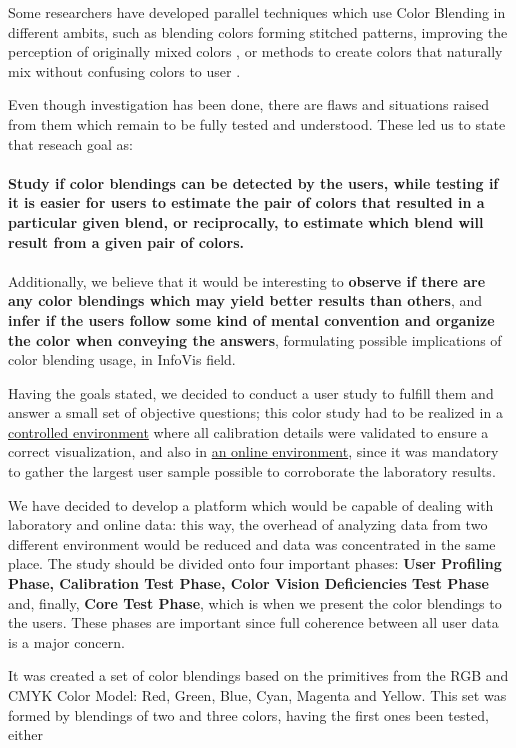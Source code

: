 %
Some researchers have developed parallel techniques which use Color Blending in different
ambits, such as blending colors forming stitched patterns, improving the perception of originally mixed
colors \cite{Urness2003}, or methods to create colors that naturally mix without confusing colors to user \cite{Chuang2009}. \par
%
Even though investigation has been done, there are flaws and situations raised from them which remain to be fully
tested and understood. These led us to state that reseach goal as: \\ \\
%
\textbf{Study if color blendings can be detected by the users, while testing if it is easier for
users to estimate the pair of colors that resulted in a particular given blend, or reciprocally, to estimate
which blend will result from a given pair of colors.} \\ \\
%
Additionally, we believe that it would be interesting to \textbf{observe if there are any color blendings which
may yield better results than others}, and \textbf{infer if the users follow some kind of mental convention and
organize the color when conveying the answers}, formulating possible implications of color blending usage, in
InfoVis field. \par
%
Having the goals stated, we decided to conduct a user study to fulfill them and answer a small set of objective
questions; this color study had to be realized in a \ul{controlled environment} where all calibration
details were validated to ensure a correct visualization, and also in \ul{an online environment}, since it
was mandatory to gather the largest user sample possible to corroborate the laboratory results. \par
%
We have decided to develop a platform which would be capable of dealing with laboratory and online data: this way,
the overhead of analyzing data from two different environment would be reduced and data was concentrated in the same
place. The study should be divided onto four important phases: \textbf{User Profiling Phase, Calibration Test Phase,
Color Vision Deficiencies Test Phase} and, finally, \textbf{Core Test Phase}, which is when we present the color
blendings to the users. These phases are important since full coherence between all user data is a major concern. \par
%
It was created a set of color blendings based on the primitives from the RGB and CMYK Color Model: Red, Green, Blue,
Cyan, Magenta and Yellow. This set was formed by blendings of two and three colors, having the first ones been tested, either
